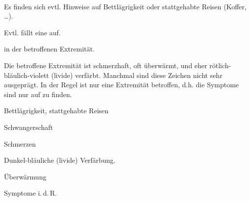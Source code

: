 \TextSlide
{\TxABCDE}
{~
\begin{ABCDEText}
  \item[\ABCDE{1}] Es finden sich evtl.
  Hinweise auf Bettlägrigkeit oder stattgehabte Reisen
  (Koffer, \ldots). 
  \item[\ABCDE{2}] Evtl. fällt eine
   auf.
  \item[\ABCDE{4}]  in der
  betroffenen Extremität.
  \item[\ABCDE{\ldots}] Die betroffene Extremität ist
  schmerzhaft, oft überwärmt, und eher
  rötlich-bläulich-violett (livide) verfärbt. Manchmal sind
  diese Zeichen nicht sehr ausgeprägt.
  In der Regel ist nur eine Extremität betroffen, d.h. die
Symptome sind nur auf  zu finden.
\end{ABCDEText}
}
{
\begin{ABCDESlide}
  \item[\ABCDE{1}] Bettlägrigkeit, stattgehabte Reisen
  \item[\ABCDE{2}] Schwangerschaft
  \item[\ABCDE{4}] Schmerzen
  \item[\ABCDE{\ldots}] 
  \begin{compactitem}
  \item Dunkel-bläuliche (livide) Verfärbung. 
  \item Überwärmung
  \item Symptome i.\,d.\,R. 
  \end{compactitem}
\end{ABCDESlide}
}
{}
{}
{}

